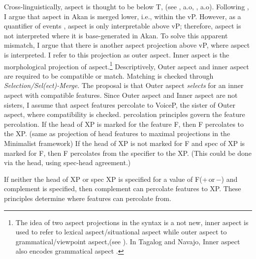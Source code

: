 \documentclass[output=paper,colorlinks,citecolor=brown]{langscibook}
\begin{document}
Cross-linguistically, aspect is thought to be below T, (see \citet{Rizzi2004} \citet{Rizzi2013Notes}, a.o, \citet{Cinque2002, Cinque2006}, \citet{RizziCinque2016} \citet{CinqueRizzi2010} a.o). Following \citet{Kandybowicz2010, Kandybowicz2015}, I argue that aspect in Akan is merged lower, i.e., within the vP.  However, as a quantifier of events \citep{Hacquard2006}, aspect is only interpretable above vP; therefore, aspect is not interpreted where it is base-generated in Akan. To solve this apparent mismatch, I argue that there is another aspect projection above vP, where aspect is interpreted. I refer to this projection as outer aspect. Inner aspect is the morphological projection of aspect.\footnote{The idea of two aspect projections in the syntax is a not new, inner aspect is used to refer to lexical aspect/situational aspect while outer aspect to grammatical/viewpoint aspect,(see \citealt{Travis2010, Travis1991, Smith1991, MacDonald2006}). In Tagalog and Navajo, Inner aspect also encodes grammatical aspect \citep{Travis2010}.} Descriptively, Outer aspect and inner aspect are required to be compatible or match. Matching is checked through \textit{Selection/Sel(ect)-Merge}. The proposal is that Outer aspect \textit{selects} for an inner aspect with compatible features. Since Outer aspect and Inner aspect are not sisters, 
I assume that aspect features percolate to VoiceP, the sister of Outer aspect, where compatibility is checked.  percolation principles govern the feature percolation. \nocite{Webelhuth1992}
\eanoraggedright \label{ex16}
\ea If the head of XP is marked for the feature F, then F percolates to the XP. (same as projection of head features to maximal projections in the Minimalist framework)
\ex If the head of XP is not marked for F and spec of XP is marked for F, then F percolates from the specifier to the XP. (This could be done via the head, using spec-head agreement.)

\ex If neither the head of XP or spec XP is specified for a value of F(+\,or\,−) and complement is specified, then complement can percolate features to XP. 
\z
\z
These principles determine where features can percolate from.
 
\end{document}
